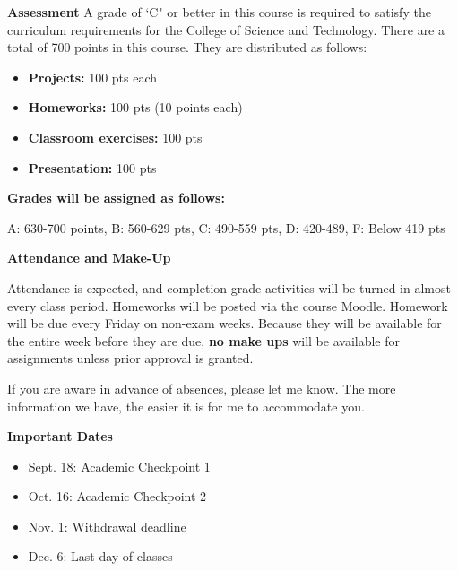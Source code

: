 \documentclass[12pt]{article}
\let\oldtextbf\textbf
\renewcommand{\textbf}[1]{\textcolor{coolblack}{\oldtextbf{#1}}}
\begin{document}
\bigskip

\begin{flushleft}
\textbf{Assessment}
A grade of `C" or better in this course is required to satisfy the curriculum requirements for the College of Science and Technology. There are a total of 700 points in this course. They are distributed as follows:

\begin{itemize}
\item \textbf{Projects:} 100 pts each
\item \textbf{Homeworks:} 100 pts (10 points each)
\item \textbf{Classroom exercises:} 100 pts
\item \textbf{Presentation:} 100 pts
\end{itemize}	

\bigskip

\textbf{Grades will be assigned as follows:}

A: 630-700 points, B: 560-629 pts, C: 490-559 pts, D: 420-489, F: Below 419 pts

\end{flushleft}

\bigskip

\begin{flushleft}
\textbf{Attendance and Make-Up}
\end{flushleft}

 Attendance is expected, and completion grade activities will be turned in almost every class period. Homeworks will be posted via the course Moodle. Homework will be due every Friday on non-exam weeks. Because they will be available for the entire week before they are due, \textbf{no make ups} will be available for assignments unless prior approval is granted. \par
 If you are aware in advance of absences, please let me know. The more information we have, the easier it is for me to accommodate you. \par

\begin{flushleft}
\textbf{Important Dates}
\end{flushleft}

\begin{itemize}
\item Sept. 18: Academic Checkpoint 1	
\item Oct. 16: Academic Checkpoint 2	
\item Nov. 1: Withdrawal deadline
\item Dec. 6: Last day of classes


\end{itemize}
\end{document}
